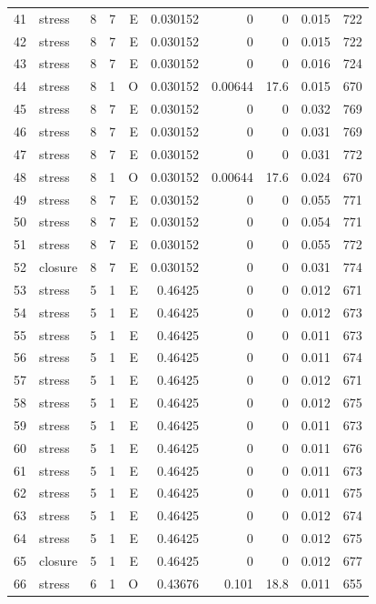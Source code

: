 \begin{longtable}{rlrrrrrrrr}
41 & stress & 8 & 7 & E & 0.030152 & 0 & 0 & 0.015 & 722 \\
42 & stress & 8 & 7 & E & 0.030152 & 0 & 0 & 0.015 & 722 \\
43 & stress & 8 & 7 & E & 0.030152 & 0 & 0 & 0.016 & 724 \\
44 & stress & 8 & 1 & O & 0.030152 & 0.00644 & 17.6 & 0.015 & 670 \\
45 & stress & 8 & 7 & E & 0.030152 & 0 & 0 & 0.032 & 769 \\
46 & stress & 8 & 7 & E & 0.030152 & 0 & 0 & 0.031 & 769 \\
47 & stress & 8 & 7 & E & 0.030152 & 0 & 0 & 0.031 & 772 \\
48 & stress & 8 & 1 & O & 0.030152 & 0.00644 & 17.6 & 0.024 & 670 \\
49 & stress & 8 & 7 & E & 0.030152 & 0 & 0 & 0.055 & 771 \\
50 & stress & 8 & 7 & E & 0.030152 & 0 & 0 & 0.054 & 771 \\
51 & stress & 8 & 7 & E & 0.030152 & 0 & 0 & 0.055 & 772 \\
52 & closure & 8 & 7 & E & 0.030152 & 0 & 0 & 0.031 & 774 \\
53 & stress & 5 & 1 & E & 0.46425 & 0 & 0 & 0.012 & 671 \\
54 & stress & 5 & 1 & E & 0.46425 & 0 & 0 & 0.012 & 673 \\
55 & stress & 5 & 1 & E & 0.46425 & 0 & 0 & 0.011 & 673 \\
56 & stress & 5 & 1 & E & 0.46425 & 0 & 0 & 0.011 & 674 \\
57 & stress & 5 & 1 & E & 0.46425 & 0 & 0 & 0.012 & 671 \\
58 & stress & 5 & 1 & E & 0.46425 & 0 & 0 & 0.012 & 675 \\
59 & stress & 5 & 1 & E & 0.46425 & 0 & 0 & 0.011 & 673 \\
60 & stress & 5 & 1 & E & 0.46425 & 0 & 0 & 0.011 & 676 \\
61 & stress & 5 & 1 & E & 0.46425 & 0 & 0 & 0.011 & 673 \\
62 & stress & 5 & 1 & E & 0.46425 & 0 & 0 & 0.011 & 675 \\
63 & stress & 5 & 1 & E & 0.46425 & 0 & 0 & 0.012 & 674 \\
64 & stress & 5 & 1 & E & 0.46425 & 0 & 0 & 0.012 & 675 \\
65 & closure & 5 & 1 & E & 0.46425 & 0 & 0 & 0.012 & 677 \\
66 & stress & 6 & 1 & O & 0.43676 & 0.101 & 18.8 & 0.011 & 655 \\

\end{longtable}
